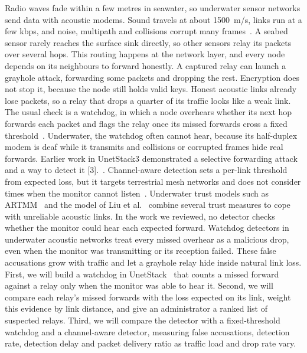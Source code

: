 \documentclass{article}
\begin{document}
Radio waves fade within a few metres in seawater, so underwater sensor networks send data with acoustic modems.
Sound travels at about 1500~m/s, links run at a few kbps, and noise, multipath and collisions corrupt many frames~\cite{akyildiz2005}.
A seabed sensor rarely reaches the surface sink directly, so other sensors relay its packets over several hops.
This routing happens at the network layer, and every node depends on its neighbours to forward honestly.
A captured relay can launch a grayhole attack, forwarding some packets and dropping the rest.
Encryption does not stop it, because the node still holds valid keys.
Honest acoustic links already lose packets, so a relay that drops a quarter of its traffic looks like a weak link.
The usual check is a watchdog, in which a node overhears whether its next hop forwards each packet and flags the relay once its missed forwards cross a fixed threshold~\cite{marti2000}.
Underwater, the watchdog often cannot hear, because its half-duplex modem is deaf while it transmits and collisions or corrupted frames hide real forwards.
Earlier work in UnetStack3 demonstrated a selective forwarding attack and a way to detect it [3].~\cite{chandavarkar2021}.
Channel-aware detection sets a per-link threshold from expected loss, but it targets terrestrial mesh networks and does not consider times when the monitor cannot listen~\cite{shila2009}.
Underwater trust models such as ARTMM~\cite{han2015} and the model of Liu et al.~\cite{liu2024} combine several trust measures to cope with unreliable acoustic links.
In the work we reviewed, no detector checks whether the monitor could hear each expected forward.
Watchdog detectors in underwater acoustic networks treat every missed overhear as a malicious drop, even when the monitor was transmitting or its reception failed.
These false accusations grow with traffic and let a grayhole relay hide inside natural link loss.
First, we will build a watchdog in UnetStack~\cite{chitre2014} that counts a missed forward against a relay only when the monitor was able to hear it.
Second, we will compare each relay's missed forwards with the loss expected on its link, weight this evidence by link distance, and give an administrator a ranked list of suspected relays.
Third, we will compare the detector with a fixed-threshold watchdog and a channel-aware detector, measuring false accusations, detection rate, detection delay and packet delivery ratio as traffic load and drop rate vary.
\end{document}
